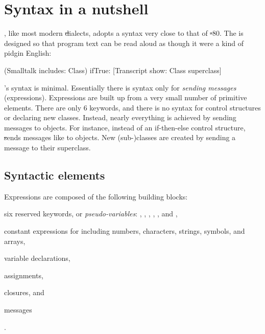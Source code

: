 \documentclass[a4paper,10pt,twoside]{book}
\begin{document}
	\renewcommand{\nnbb}[2]{} %
	\sloppy
\fi
\chapter{Syntax in a nutshell}
\label{cha:syntax}


\sq, like most modern \st dialects, adopts a syntax very close to that of \st-80.
The  is designed so that program text can be read aloud as though it were a kind of pidgin English:

\begin{code}{}
(Smalltalk includes: Class) ifTrue: [Transcript show: Class superclass]
\end{code}

\noindent
\sq's syntax is minimal.
Essentially there is syntax only for \emph{sending messages} (\ie expressions).
Expressions are built up from a very small number of  primitive elements.
There are only 6 keywords, and there is no syntax for control structures or declaring new classes.
Instead, nearly everything is achieved by sending messages to objects.
For instance, instead of an if-then-else control structure, \st sends messages like  to  objects.
New \mbox{(sub-)classes} are created by sending a message to their superclass.

\section{Syntactic elements}

Expressions are composed of the following building blocks:
\begin{enumerate*} [label=(\roman*)]
	\item six reserved keywords, or \emph{pseudo-variables}:
	, , , , , and ,
	\item constant expressions for  including numbers, characters, strings, symbols, and arrays,
	\item variable declarations,
	\item assignments,
	\item {} closures,
	and \item messages%
\end{enumerate*}.
\end{document}
